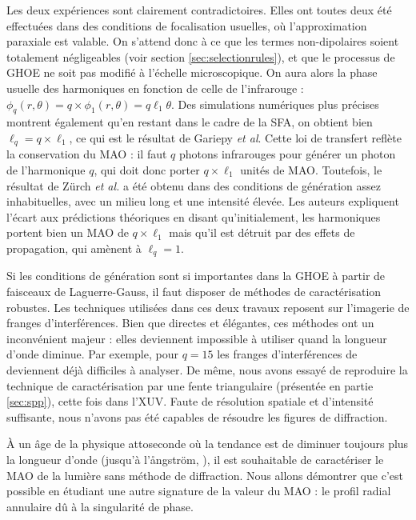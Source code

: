 Les deux expériences sont clairement contradictoires. Elles ont toutes deux été effectuées dans des conditions de focalisation usuelles, où l'approximation paraxiale est valable. On s'attend donc à ce que les termes non-dipolaires soient totalement négligeables (voir section \ref{sec:selectionrules}), et que le processus de GHOE ne soit pas modifié à l'échelle microscopique. On aura alors la phase usuelle des harmoniques en fonction de celle de l'infrarouge : $\phi_q(r,\theta) = q\times\phi_1(r,\theta) = q\ell_1\theta$. Des simulations numériques plus précises  montrent également qu'en restant dans le cadre de la SFA, on obtient bien $\ell_{q}=q\times\ell_1$, ce qui est le résultat de Gariepy \textit{et al}. Cette loi de transfert reflète la conservation du MAO : il faut $q$ photons infrarouges pour générer un photon de l'harmonique $q$, qui doit donc porter $q\times\ell_1$ unités de MAO.
Toutefois, le résultat de Zürch \textit{et al.} a été obtenu dans des conditions de génération assez inhabituelles, avec un milieu long et une intensité élevée. Les auteurs expliquent l'écart aux prédictions théoriques en disant qu'initialement, les harmoniques portent bien un MAO de $q\times\ell_1$ mais qu'il est détruit par des effets de propagation, qui amènent à $\ell_q = 1$.

Si les conditions de génération sont si importantes dans la GHOE à partir de faisceaux de Laguerre-Gauss, il faut disposer de méthodes de caractérisation robustes. Les techniques utilisées dans ces deux travaux reposent sur l'imagerie de franges d'interférences. Bien que directes et élégantes, ces méthodes ont un inconvénient majeur : elles deviennent impossible à utiliser quand la longueur d'onde diminue. Par exemple, pour $q=15$ les franges d'interférences de  deviennent déjà difficiles à analyser. De même, nous avons essayé de reproduire la technique de caractérisation par une fente triangulaire (présentée en partie \ref{sec:spp}), cette fois dans l'XUV. Faute de résolution spatiale et d'intensité suffisante, nous n'avons pas été capables de résoudre les figures de diffraction.

\`{A} un âge de la physique attoseconde où la tendance est de diminuer toujours plus la longueur d'onde (jusqu'à l'{\aa}ngström, ), il est souhaitable de caractériser le MAO de la lumière sans méthode de diffraction. Nous allons démontrer que c'est possible en étudiant une autre signature de la valeur du MAO : le profil radial annulaire dû à la singularité de phase.

